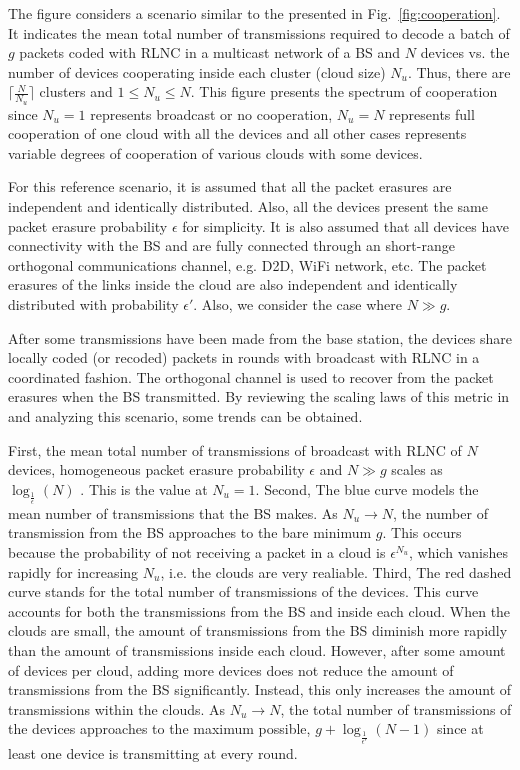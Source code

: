 The figure considers a scenario similar to the presented in Fig.~\ref{fig:cooperation}. It indicates the mean total number of transmissions required to decode a batch of $g$ packets coded with \ac{RLNC} in a multicast network of a \ac{BS} and $N$ devices vs. the number of devices cooperating inside each cluster (cloud size) $N_u$. Thus, there are $\lceil \frac{N}{N_u} \rceil$ clusters and $1 \leq N_u \leq N$. This figure presents the spectrum of cooperation since $N_u = 1$ represents broadcast or no cooperation, $N_u = N$ represents full cooperation of one cloud with all the devices and all other cases represents variable degrees of cooperation of various clouds with some devices.

For this reference scenario, it is assumed that all the packet erasures are independent and identically distributed. Also, all the devices present the same packet erasure probability $\epsilon$ for simplicity. It is also assumed that all devices have connectivity with the \ac{BS} and are fully connected through an short-range orthogonal communications channel, e.g. \ac{D2D}, \ac{WiFi} network, etc. The packet erasures of the links inside the cloud are also independent and identically distributed with probability $\epsilon'$. Also, we consider the case where $N \gg g$.

After some transmissions have been made from the base station, the devices share locally coded (or recoded) packets in rounds with broadcast with \ac{RLNC} in a coordinated fashion. The orthogonal channel is used to recover from the packet erasures when the \ac{BS} transmitted. By reviewing the scaling laws of this metric in \cite{eryilmaz2008delay} and analyzing this scenario, some trends can be obtained.

First, the mean total number of transmissions of broadcast with \ac{RLNC} of $N$ devices, homogeneous packet erasure probability $\epsilon$ and $N \gg g$ scales as $\log_{\frac{1}{\epsilon}}(N)$ \cite{eryilmaz2008delay}. This is the value at $N_u = 1$. Second, The blue curve models the mean number of transmissions that the \ac{BS} makes. As $N_u \rightarrow N$, the number of transmission from the \ac{BS} approaches to the bare minimum $g$. This occurs because the probability of not receiving a packet in a cloud is ${\epsilon}^{N_u}$, which vanishes rapidly for increasing $N_u$, i.e. the clouds are very realiable. Third, The red dashed curve stands for the total number of transmissions of the devices. This curve accounts for both the transmissions from the \ac{BS} and inside each cloud. When the clouds are small, the amount of transmissions from the \ac{BS} diminish more rapidly than the amount of transmissions inside each cloud. However, after some amount of devices per cloud, adding more devices does not reduce the amount of transmissions from the \ac{BS} significantly. Instead, this only increases the amount of transmissions within the clouds. As $N_u \rightarrow N$, the total number of transmissions of the devices approaches to the maximum possible, $ g + \log_{\frac{1}{\epsilon'}}(N - 1)$ since at least one device is transmitting at every round.

